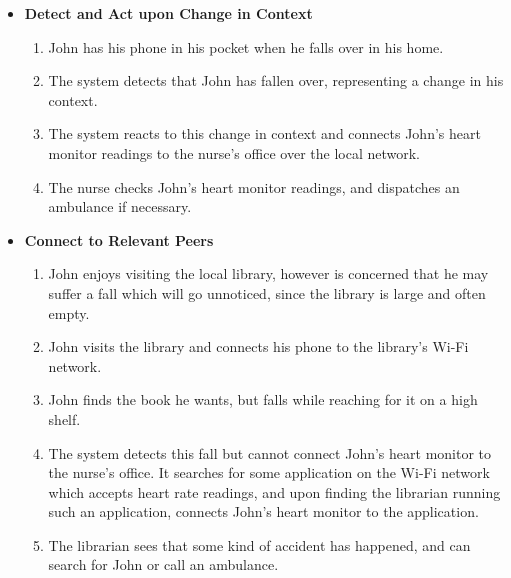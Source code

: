 \documentclass[12pt,twoside,notitlepage]{report}
\begin{document}
\begin{itemize}

\item {\bf Detect and Act upon Change in Context}

\begin{enumerate}

\item John has his phone in his pocket when he falls over in his home.

\item The system detects that John has fallen over, representing a change in his context.

\item The system reacts to this change in context and connects John's heart monitor readings to the nurse's office over the local network.

\item The nurse checks John's heart monitor readings, and dispatches an ambulance if necessary.

\end{enumerate}

\item {\bf Connect to Relevant Peers}

\begin{enumerate}

\item John enjoys visiting the local library, however is concerned that he may suffer a fall which will go unnoticed, since the library is large and often empty.

\item John visits the library and connects his phone to the library's Wi-Fi network.

\item John finds the book he wants, but falls while reaching for it on a high shelf.

\item The system detects this fall but cannot connect John's heart monitor to the nurse's office. It searches for some application on the Wi-Fi network which accepts heart rate readings, and upon finding the librarian running such an application, connects John's heart monitor to the application.

\item The librarian sees that some kind of accident has happened, and can search for John or call an ambulance.

\end{enumerate}


\end{itemize}
\end{document}
